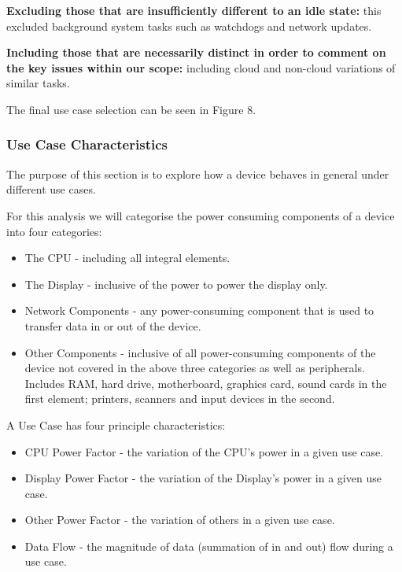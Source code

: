 \documentclass[conference]{IEEEtran}
\begin{document}
{\textbf{Excluding those that are insufficiently different to an idle
    state:}} this excluded background system tasks such as watchdogs and network
updates.

{\textbf{Including those that are necessarily distinct in order to
    comment on the key issues within our scope:}} including cloud and
non-cloud variations of similar tasks.

The final use case selection can be seen in Figure 8.

\subsubsection{Use Case Characteristics}

The purpose of this section is to explore how a device behaves in general under different use cases.


For this analysis we will categorise the power consuming components of
a device into four categories:

\begin{itemize}
\item The CPU - including all integral elements.
\item The Display - inclusive of the power to power the display only.
\item Network Components - any power-consuming component that is used to transfer data in or out of the device.
\item Other Components - inclusive of all power-consuming components
  of the device not covered in the above three categories as well as
  peripherals. Includes RAM, hard drive, motherboard, graphics
  card, sound cards in the first element; printers, scanners and input
  devices in the second.
\end{itemize}


A Use Case has four principle characteristics:

\begin{itemize}
\item CPU Power Factor - the variation of the CPU’s power in a given use case.
\item Display Power Factor - the variation of the Display’s power in a given use case.
\item Other Power Factor - the variation of others in a given use case.
\item Data Flow - the magnitude of data (summation of in and out) flow during a use case.
\end{itemize}
\end{document}
